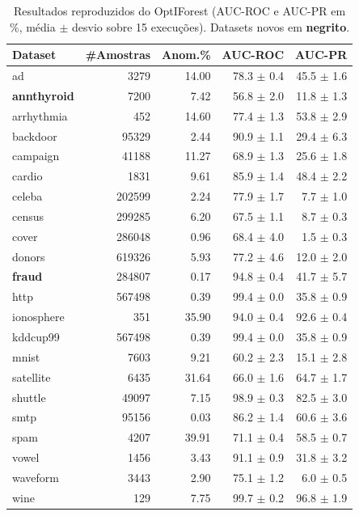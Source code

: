 \documentclass[conference]{IEEEtran}
\begin{document}
\begin{table}[t]
\centering
\caption{Resultados reproduzidos do OptIForest (AUC-ROC e AUC-PR em \%,
m\'edia $\pm$ desvio sobre 15 execu\c{c}\~oes). Datasets novos em \textbf{negrito}.}
\label{tab:repro}
\footnotesize
\setlength{\tabcolsep}{3.5pt}
\begin{tabular}{lrrrr}
\toprule
Dataset & \#Amostras & Anom.\% & AUC-ROC & AUC-PR \\
\midrule
ad & 3279 & 14.00 & 78.3 $\pm$ 0.4 & 45.5 $\pm$ 1.6 \\
\textbf{annthyroid} & 7200 & 7.42 & 56.8 $\pm$ 2.0 & 11.8 $\pm$ 1.3 \\
arrhythmia & 452 & 14.60 & 77.4 $\pm$ 1.3 & 53.8 $\pm$ 2.9 \\
backdoor & 95329 & 2.44 & 90.9 $\pm$ 1.1 & 29.4 $\pm$ 6.3 \\
campaign & 41188 & 11.27 & 68.9 $\pm$ 1.3 & 25.6 $\pm$ 1.8 \\
cardio & 1831 & 9.61 & 85.9 $\pm$ 1.4 & 48.4 $\pm$ 2.2 \\
celeba & 202599 & 2.24 & 77.9 $\pm$ 1.7 & 7.7 $\pm$ 1.0 \\
census & 299285 & 6.20 & 67.5 $\pm$ 1.1 & 8.7 $\pm$ 0.3 \\
cover & 286048 & 0.96 & 68.4 $\pm$ 4.0 & 1.5 $\pm$ 0.3 \\
donors & 619326 & 5.93 & 77.2 $\pm$ 4.6 & 12.0 $\pm$ 2.0 \\
\textbf{fraud} & 284807 & 0.17 & 94.8 $\pm$ 0.4 & 41.7 $\pm$ 5.7 \\
http & 567498 & 0.39 & 99.4 $\pm$ 0.0 & 35.8 $\pm$ 0.9 \\
ionosphere & 351 & 35.90 & 94.0 $\pm$ 0.4 & 92.6 $\pm$ 0.4 \\
kddcup99 & 567498 & 0.39 & 99.4 $\pm$ 0.0 & 35.8 $\pm$ 0.9 \\
mnist & 7603 & 9.21 & 60.2 $\pm$ 2.3 & 15.1 $\pm$ 2.8 \\
satellite & 6435 & 31.64 & 66.0 $\pm$ 1.6 & 64.7 $\pm$ 1.7 \\
shuttle & 49097 & 7.15 & 98.9 $\pm$ 0.3 & 82.5 $\pm$ 3.0 \\
smtp & 95156 & 0.03 & 86.2 $\pm$ 1.4 & 60.6 $\pm$ 3.6 \\
spam & 4207 & 39.91 & 71.1 $\pm$ 0.4 & 58.5 $\pm$ 0.7 \\
vowel & 1456 & 3.43 & 91.1 $\pm$ 0.9 & 31.8 $\pm$ 3.2 \\
waveform & 3443 & 2.90 & 75.1 $\pm$ 1.2 & 6.0 $\pm$ 0.5 \\
wine & 129 & 7.75 & 99.7 $\pm$ 0.2 & 96.8 $\pm$ 1.9 \\
\bottomrule
\end{tabular}
\end{table}
\end{document}
